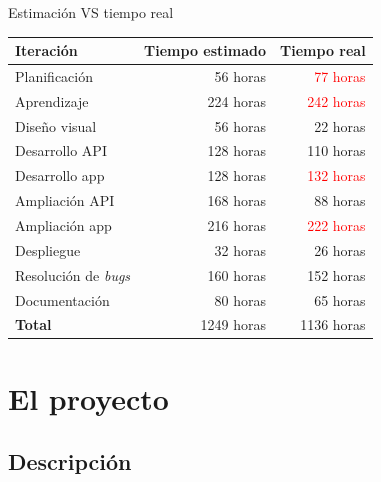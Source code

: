 \documentclass[10pt,xcolor=svgnames]{beamer}
\begin{document}
\begin{frame}{Estimación VS tiempo real}
  \begin{cambiarmargen}{-2.5cm}{-2.5cm}

    \begin{table}[hbtp]
      \centering
      \begin{tabular}{|l|r|r|}
        \hline
        \textbf{Iteración} & \textbf{Tiempo estimado} & \textbf{Tiempo real} \\
        \hline
        Planificación & 56 horas & \textcolor{red}{77 horas} \\
        \hline
        Aprendizaje & 224 horas & \textcolor{red}{242 horas} \\
        \hline
        Diseño visual & 56 horas & \textcolor{verde}{22 horas} \\
        \hline
        Desarrollo API & 128 horas & \textcolor{verde}{110 horas} \\
        \hline
        Desarrollo app & 128 horas & \textcolor{red}{132 horas} \\
        \hline
        Ampliación API & 168 horas & \textcolor{verde}{88 horas} \\
        \hline
        Ampliación app & 216 horas & \textcolor{red}{222 horas} \\
        \hline
        Despliegue & 32 horas & \textcolor{verde}{26 horas} \\
        \hline
        Resolución de \textit{bugs} & 160 horas & \textcolor{verde}{152 horas} \\
        \hline
        Documentación & 80 horas & \textcolor{verde}{65 horas} \\
        \hline
        \textbf{Total} & 1249 horas & \textcolor{verde}{1136 horas} \\
        \hline
      \end{tabular}
      \label{tab:estimacion_tiempo}
    \end{table}
    
  \end{cambiarmargen}
\end{frame}



\section{El proyecto}

\subsection{Descripción}
\end{document}

